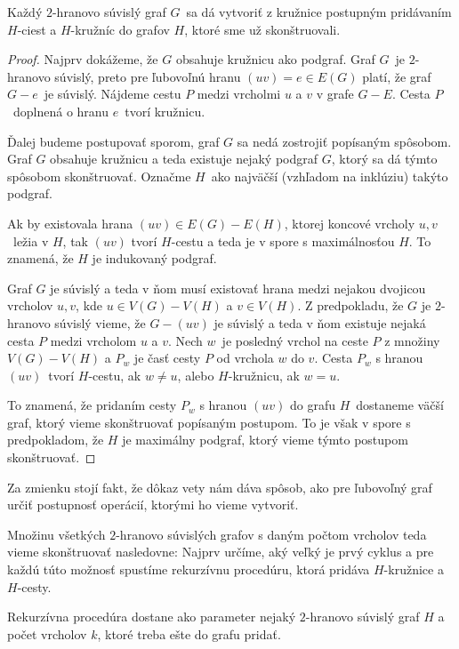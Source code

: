\begin{veta}
    Každý $2$-hranovo súvislý graf $G$ sa dá vytvoriť z kružnice postupným pridávaním
    $H$-ciest a $H$-kružníc do grafov $H$, ktoré sme už skonštruovali.
\end{veta}
\begin{proof}
    Najprv dokážeme, že $G$ obsahuje kružnicu ako podgraf. Graf $G$ je $2$-hranovo súvislý,
    preto pre ľubovoľnú hranu $(uv) = e \in E(G)$ platí, že graf $G - e$ je súvislý. Nájdeme
    cestu $P$ medzi vrcholmi $u$ a $v$ v grafe $G - E$. Cesta $P$ doplnená o hranu $e$ tvorí
    kružnicu.

    Ďalej budeme postupovať sporom, graf $G$ sa nedá zostrojiť popísaným spôsobom. Graf $G$
    obsahuje kružnicu a teda existuje nejaký podgraf $G$, ktorý sa dá týmto spôsobom
    skonštruovať. Označme $H$ ako najväčší (vzhľadom na inklúziu) takýto podgraf.

    Ak by existovala hrana $(uv) \in E(G) - E(H)$, ktorej koncové vrcholy $u, v$ ležia v
    $H$, tak $(uv)$ tvorí $H$-cestu a teda je v spore s maximálnosťou $H$. To znamená, že
    $H$ je indukovaný podgraf.
    
    Graf $G$ je súvislý a teda v ňom musí existovať hrana
    medzi nejakou dvojicou vrcholov $u, v$, kde $u \in V(G) - V(H)$ a $v \in V(H)$.
    Z predpokladu, že $G$ je $2$-hranovo súvislý vieme, že $G - (uv)$ je súvislý a teda
    v ňom existuje nejaká cesta $P$ medzi vrcholom $u$ a $v$. Nech $w$ je posledný vrchol
    na ceste $P$ z množiny $V(G) - V(H)$ a $P_w$ je časť cesty $P$ od vrchola $w$ do $v$.
    Cesta $P_w$ s hranou $(uv)$ tvorí $H$-cestu, ak $w \neq u$, alebo $H$-kružnicu, ak $w = u$.

    To znamená, že pridaním cesty $P_w$ s hranou $(uv)$ do grafu $H$ dostaneme väčší graf,
    ktorý vieme skonštruovať popísaným postupom. To je však v spore s predpokladom, že $H$ je
    maximálny podgraf, ktorý vieme týmto postupom skonštruovať.
\end{proof}

Za zmienku stojí fakt, že dôkaz vety nám dáva spôsob, ako pre ľubovoľný graf určiť
postupnosť operácií, ktorými ho vieme vytvoriť.

Množinu všetkých $2$-hranovo súvislých grafov s daným počtom vrcholov teda vieme skonštruovať
nasledovne: Najprv určíme, aký veľký je prvý cyklus a pre každú túto možnosť spustíme
rekurzívnu procedúru, ktorá pridáva $H$-kružnice a $H$-cesty.

Rekurzívna procedúra dostane ako parameter nejaký $2$-hranovo súvislý graf $H$ a počet
vrcholov $k$, ktoré treba ešte do grafu pridať.

